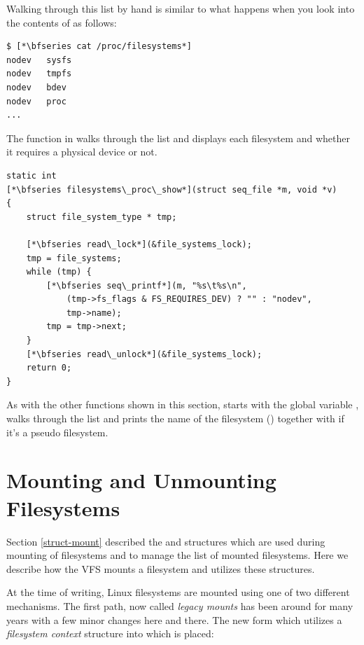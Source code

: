 \noindent
Walking through this list by hand is similar to what happens when you look into the contents of  as follows:

\begin{lstlisting}
$ [*\bfseries cat /proc/filesystems*]
nodev	sysfs
nodev	tmpfs
nodev	bdev
nodev	proc
...
\end{lstlisting}

\noindent
The  function in  walks through the list and displays each filesystem and whether it requires a physical device or not.

\begin{lstlisting}
static int 
[*\bfseries filesystems\_proc\_show*](struct seq_file *m, void *v)
{
    struct file_system_type * tmp;

    [*\bfseries read\_lock*](&file_systems_lock);
    tmp = file_systems;
    while (tmp) {
        [*\bfseries seq\_printf*](m, "%s\t%s\n",
            (tmp->fs_flags & FS_REQUIRES_DEV) ? "" : "nodev",
            tmp->name);
        tmp = tmp->next;
    }
    [*\bfseries read\_unlock*](&file_systems_lock);
    return 0;
}
\end{lstlisting}

\noindent
As with the other functions shown in this section,  starts with the global variable , walks through the list and prints the name of the filesystem () together with  if it's a pseudo filesystem.


\section{Mounting and Unmounting Filesystems}

Section \ref{struct-mount} described the  and  structures which are used during mounting of filesystems and to manage the list of mounted filesystems. Here we describe how the VFS mounts a filesystem and utilizes these structures.

At the time of writing, Linux filesystems are mounted using one of two different mechanisms. The first path, now called \textit{legacy mounts} has been around for many years with a few minor changes here and there. The new form which utilizes 
a \textit{filesystem context} structure into which is placed:

